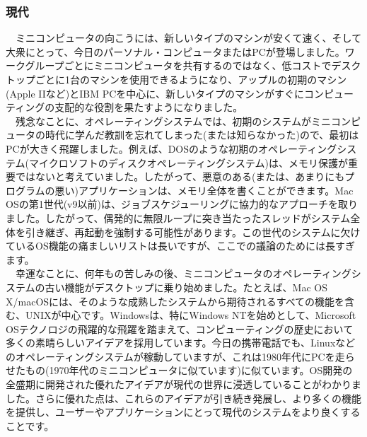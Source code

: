 \hypertarget{ux73feux4ee3}{%
\subsubsection*{現代}\label{ux73feux4ee3}}

　ミニコンピュータの向こうには、新しいタイプのマシンが安くて速く、そして大衆にとって、今日のパーソナル・コンピュータまたはPCが登場しました。ワークグループごとにミニコンピュータを共有するのではなく、低コストでデスクトップごとに1台のマシンを使用できるようになり、アップルの初期のマシン(Apple
IIなど)とIBM
PCを中心に、新しいタイプのマシンがすぐにコンピューティングの支配的な役割を果たすようになりました。\\
　残念なことに、オペレーティングシステムでは、初期のシステムがミニコンピュータの時代に学んだ教訓を忘れてしまった(または知らなかった)ので、最初はPCが大きく飛躍しました。例えば、DOSのような初期のオペレーティングシステム(マイクロソフトのディスクオペレーティングシステム)は、メモリ保護が重要ではないと考えていました。したがって、悪意のある(または、あまりにもプログラムの悪い)アプリケーションは、メモリ全体を書くことができます。Mac
OSの第1世代(v9以前)は、ジョブスケジューリングに協力的なアプローチを取りました。したがって、偶発的に無限ループに突き当たったスレッドがシステム全体を引き継ぎ、再起動を強制する可能性があります。この世代のシステムに欠けているOS機能の痛ましいリストは長いですが、ここでの議論のためには長すぎます。\\
　幸運なことに、何年もの苦しみの後、ミニコンピュータのオペレーティングシステムの古い機能がデスクトップに乗り始めました。たとえば、Mac
OS
X/macOSには、そのような成熟したシステムから期待されるすべての機能を含む、UNIXが中心です。Windowsは、特にWindows
NTを始めとして、Microsoft
OSテクノロジの飛躍的な飛躍を踏まえて、コンピューティングの歴史において多くの素晴らしいアイデアを採用しています。今日の携帯電話でも、Linuxなどのオペレーティングシステムが稼動していますが、これは1980年代にPCを走らせたもの(1970年代のミニコンピュータに似ています)に似ています。OS開発の全盛期に開発された優れたアイデアが現代の世界に浸透していることがわかりました。さらに優れた点は、これらのアイデアが引き続き発展し、より多くの機能を提供し、ユーザーやアプリケーションにとって現代のシステムをより良くすることです。

